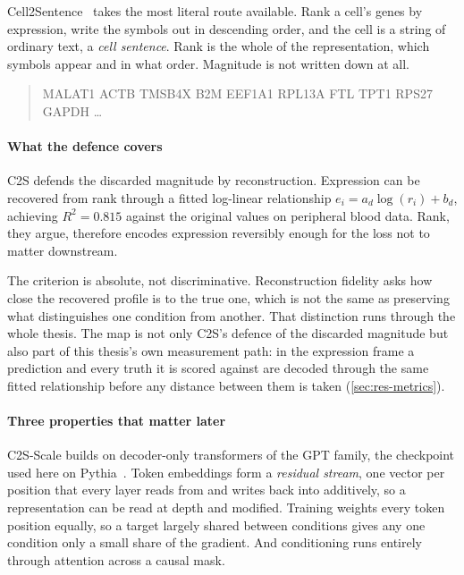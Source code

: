 \noindent
Cell2Sentence~\cite{c2s} takes the most literal route available. Rank a cell's
genes by expression, write the symbols out in descending order, and the cell is a
string of ordinary text, a \emph{cell sentence}. Rank is the whole of the
representation, which symbols appear and in what order. Magnitude is not written
down at all.

\begin{quote}
\ttfamily\small
MALAT1 ACTB TMSB4X B2M EEF1A1 RPL13A FTL TPT1 RPS27 GAPDH \dots
\end{quote}

\paragraph{What the defence covers} C2S defends the discarded magnitude by
reconstruction. Expression can be recovered from rank through a fitted
log-linear relationship $e_i = a_d\log(r_i) + b_d$, achieving $R^2 = 0.815$
against the original values on peripheral blood data. Rank, they argue,
therefore encodes expression reversibly enough for the loss not to matter
downstream.

The criterion is absolute, not discriminative. Reconstruction fidelity asks how
close the recovered profile is to the true one, which is not the same as
preserving what distinguishes one condition from another. That distinction runs
through the whole thesis. The map is not only C2S's defence of the discarded
magnitude but also part of this thesis's own measurement path: in the expression
frame a prediction and every truth it is scored against are decoded through the
same fitted relationship before any distance between them is taken
(\cref{sec:res-metrics}).

\paragraph{Three properties that matter later}
C2S-Scale builds on decoder-only transformers of the GPT family, the checkpoint
used here on Pythia~\cite{pythia}. Token embeddings form a \emph{residual
stream}, one vector per position that every layer reads from and writes back into
additively, so a representation can be read at depth and
modified. Training weights every token position equally, so a target largely
shared between conditions gives any one condition only a small share of the
gradient. And conditioning runs entirely through attention across a causal mask.

